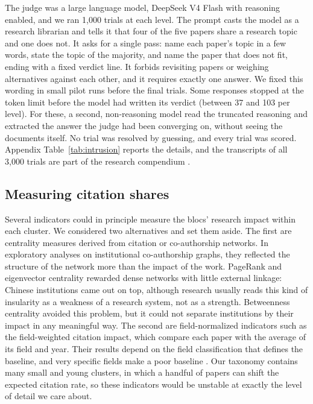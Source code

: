 \documentclass[10pt,twocolumn,a4paper]{article}
\begin{document}
	The judge was a large language model, DeepSeek V4 Flash with reasoning enabled, and we ran 1,000 trials at each level. The prompt casts the model as a research librarian and tells it that four of the five papers share a research topic and one does not. It asks for a single pass: name each paper's topic in a few words, state the topic of the majority, and name the paper that does not fit, ending with a fixed verdict line. It forbids revisiting papers or weighing alternatives against each other, and it requires exactly one answer. We fixed this wording in small pilot runs before the final trials. Some responses stopped at the token limit before the model had written its verdict (between 37 and 103 per level). For these, a second, non-reasoning model read the truncated reasoning and extracted the answer the judge had been converging on, without seeing the documents itself. No trial was resolved by guessing, and every trial was scored. Appendix Table~\ref{tab:intrusion} reports the details, and the transcripts of all 3,000 trials are part of the research compendium \parencite{pfundstein2026compendium}.
	
	\subsection{Measuring citation shares}
	\label{sec:impact_method}
	
	Several indicators could in principle measure the blocs' research impact within each cluster. We considered two alternatives and set them aside. The first are centrality measures derived from citation or co-authorship networks. In exploratory analyses on institutional co-authorship graphs, they reflected the structure of the network more than the impact of the work. PageRank and eigenvector centrality rewarded dense networks with little external linkage: Chinese institutions came out on top, although research usually reads this kind of insularity as a weakness of a research system, not as a strength. Betweenness centrality avoided this problem, but it could not separate institutions by their impact in any meaningful way. The second are field-normalized indicators such as the field-weighted citation impact, which compare each paper with the average of its field and year. Their results depend on the field classification that defines the baseline, and very specific fields make a poor baseline \parencite{waltman2019field}. Our taxonomy contains many small and young clusters, in which a handful of papers can shift the expected citation rate, so these indicators would be unstable at exactly the level of detail we care about.
	
\end{document}
